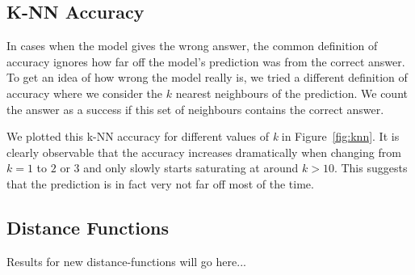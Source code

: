 \documentclass[conference]{IEEEtran}
\begin{document}
\subsection{K-NN Accuracy}
In cases when the model gives the wrong answer, the common definition of accuracy ignores how far off the model's prediction was from the correct answer. To get an idea of how wrong the model really is, we tried a different definition of accuracy where we consider the $k$ nearest neighbours of the prediction. We count the answer as a success if this set of neighbours contains the correct answer.

We plotted this k-NN accuracy for different values of \textit{k} in Figure~\ref{fig:knn}. It is clearly observable that the accuracy increases dramatically when changing from $k=1$ to $2$ or $3$ and only slowly starts saturating at around $k>10$. This suggests that the prediction is in fact very not far off most of the time. 

\subsection{Distance Functions}
Results for new distance-functions will go here...
\end{document}
